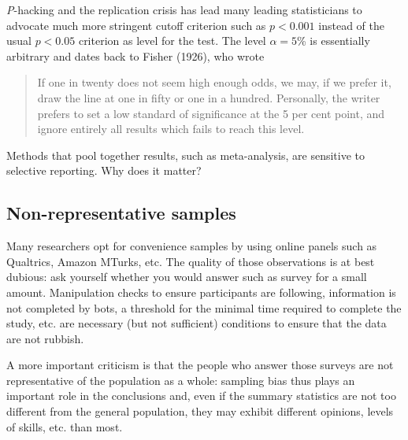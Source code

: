 \documentclass[
  11pt,
  letterpaper,
]{scrbook}
\theoremstyle{definition}
\theoremstyle{definition}
\theoremstyle{remark}
\begin{document}
\emph{P}-hacking and the replication crisis has lead many leading
statisticians to advocate much more stringent cutoff criterion such as
\(p < 0.001\) instead of the usual \(p<0.05\) criterion as level for the
test. The level \(\alpha=5\)\% is essentially arbitrary and dates back
to Fisher (1926), who wrote

\begin{quote}
If one in twenty does not seem high enough odds, we may, if we prefer
it, draw the line at one in fifty or one in a hundred. Personally, the
writer prefers to set a low standard of significance at the 5 per cent
point, and ignore entirely all results which fails to reach this level.
\end{quote}

\begin{tcolorbox}[enhanced jigsaw, left=2mm, leftrule=.75mm, coltitle=black, breakable, bottomrule=.15mm, colframe=quarto-callout-note-color-frame, titlerule=0mm, colbacktitle=quarto-callout-note-color!10!white, rightrule=.15mm, toprule=.15mm, title=\textcolor{quarto-callout-note-color}{\faInfo}\hspace{0.5em}{Thinking outside the box}, opacityback=0, toptitle=1mm, bottomtitle=1mm, arc=.35mm, opacitybacktitle=0.6, colback=white]

Methods that pool together results, such as meta-analysis, are sensitive
to selective reporting. Why does it matter?

\end{tcolorbox}

\subsection{Non-representative
samples}\label{non-representative-samples}

Many researchers opt for convenience samples by using online panels such
as Qualtrics, Amazon MTurks, etc. The quality of those observations is
at best dubious: ask yourself whether you would answer such as survey
for a small amount. Manipulation checks to ensure participants are
following, information is not completed by bots, a threshold for the
minimal time required to complete the study, etc. are necessary (but not
sufficient) conditions to ensure that the data are not rubbish.

A more important criticism is that the people who answer those surveys
are not representative of the population as a whole: sampling bias thus
plays an important role in the conclusions and, even if the summary
statistics are not too different from the general population, they may
exhibit different opinions, levels of skills, etc. than most.
\end{document}

